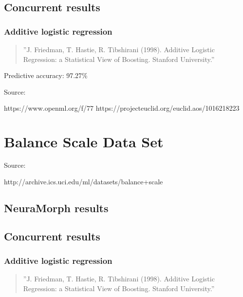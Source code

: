 \documentclass[8pt, a4paper]{article}
\begin{document}


\subsection{Concurrent results}

\subsubsection{Additive logistic regression}

\begin{quote}
''J. Friedman, T. Hastie, R. Tibshirani (1998). Additive Logistic Regression: a Statistical View of Boosting. Stanford University.''
\end{quote}

Predictive accuracy: 97.27\%

Source:

https://www.openml.org/f/77
https://projecteuclid.org/euclid.aos/1016218223










\newpage
\section{Balance Scale Data Set}

Source: 

http://archive.ics.uci.edu/ml/datasets/balance+scale

\subsection{NeuraMorph results}



\subsection{Concurrent results}

\subsubsection{Additive logistic regression}

\begin{quote}
''J. Friedman, T. Hastie, R. Tibshirani (1998). Additive Logistic Regression: a Statistical View of Boosting. Stanford University.''
\end{quote}
\end{document}

